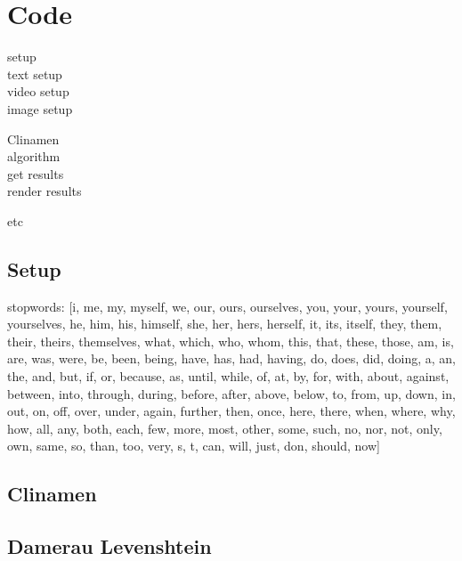 
\chapter{Code}
\label{app:code}

setup\\
 text setup\\
 video setup\\
 image setup

Clinamen\\
 algorithm\\
 get results\\
 render results

 etc

\section{Setup}



stopwords:
[i, me, my, myself, we, our, ours, ourselves, you, your, yours, yourself, yourselves, he, him, his, himself, she, her, hers, herself, it, its, itself, they, them, their, theirs, themselves, what, which, who, whom, this, that, these, those, am, is, are, was, were, be, been, being, have, has, had, having, do, does, did, doing, a, an, the, and, but, if, or, because, as, until, while, of, at, by, for, with, about, against, between, into, through, during, before, after, above, below, to, from, up, down, in, out, on, off, over, under, again, further, then, once, here, there, when, where, why, how, all, any, both, each, few, more, most, other, some, such, no, nor, not, only, own, same, so, than, too, very, s, t, can, will, just, don, should, now]

\section{Clinamen}



\section{Damerau Levenshtein}



